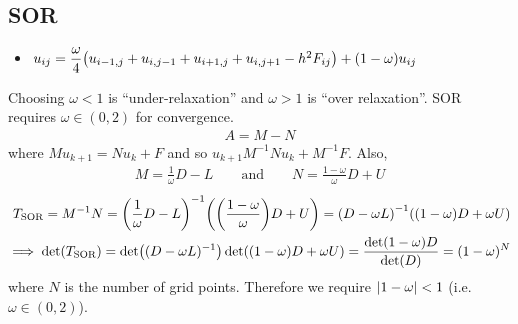 \documentclass{article}
\begin{document}
        \subsection{SOR}
            \begin{itemize}
                \item $u_{ij} = \dfrac{\omega}{4}\qty(u_{i-1,j} + u_{i,j-1} + u_{i+1,j} + u_{i,j+1} - h^2F_{ij}) + \qty(1 - \omega)u_{ij}$
            \end{itemize}
            Choosing $\omega < 1$ is ``under-relaxation'' and $\omega > 1$ is ``over relaxation''.  SOR requires $\omega \in (0,2)$ for convergence.
            \begin{align*}
                A = M - N
            \end{align*}
            where $Mu_{k+1} = Nu_k + F$ and so $u_{k+1}M^{-1}Nu_k + M^{-1}F$.  Also,
            \begin{align*}
                M = \frac{1}{\omega}D - L \qquad \text{and} \qquad N = \frac{1 - \omega}{\omega}D + U
            \end{align*}
            \begin{align*}
                T_{\text{SOR}} = M^{-1}N = \qty(\frac{1}{\omega}D - L)^{-1}\qty(\qty(\frac{1 - \omega}{\omega})D + U) = \qty(D - \omega L)^{-1}\qty((1 - \omega)D + \omega U) \\
                \implies \det(T_{\text{SOR}}) = \det((D - \omega L)^{-1})\det((1 - \omega)D + \omega U) = \frac{\det(1 - \omega)D}{\det(D)} = (1 - \omega)^N
            \end{align*}
            where $N$ is the number of grid points.  Therefore we require $\abs{1 - \omega} < 1$ (i.e.~$\omega \in (0,2)$).
\end{document}
